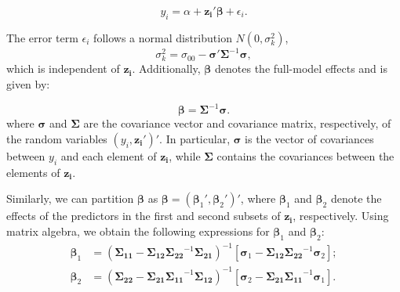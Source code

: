 $$
y_i = \alpha + \boldsymbol{z_i}'\boldsymbol{\beta} + \epsilon_i.
$$

The error term $\epsilon_i$ follows a normal distribution $N(0, \sigma_k^2)$, \begin{equation}\label{eq:sigmak2}
\sigma_k^2 = \sigma_{00} - \boldsymbol{\sigma}' \boldsymbol{\Sigma}^{-1} \boldsymbol{\sigma},
\end{equation} which is independent of $\boldsymbol{z_i}$.
Additionally, $\boldsymbol{\beta}$ denotes the full-model effects and is given by:

\begin{equation}
\label{eq:full.reg.coeff}
\boldsymbol{\beta} = \boldsymbol{\Sigma}^{-1}\boldsymbol{\sigma}. 
\end{equation}
where $\boldsymbol{\sigma}$ and $\boldsymbol{\Sigma}$ are the covariance vector and covariance matrix, respectively, of the random variables $(y_i, \boldsymbol{z_i}')'$. In particular, $\boldsymbol{\sigma}$ is the vector of covariances between $y_i$ and each element of $\boldsymbol{z_i}$, while $\boldsymbol{\Sigma}$ contains the covariances between the elements of $\boldsymbol{z_i}$.

Similarly, we can partition $\boldsymbol{\beta}$ as $\boldsymbol{\beta} = (\boldsymbol{\beta}_1', \boldsymbol{\beta}_2')'$, where $\boldsymbol{\beta}_1$ and $\boldsymbol{\beta}_2$ denote the effects of the predictors in the first and second subsets of $\boldsymbol{z_i}$, respectively. Using matrix algebra, we obtain the following expressions for $\boldsymbol{\beta}_1$ and $\boldsymbol{\beta}_2$:
\begin{equation}
\begin{aligned}
\boldsymbol{\beta}_1 &= ( \boldsymbol{\Sigma_{11}} -  \boldsymbol{\Sigma_{12}} \boldsymbol{\Sigma_{22}}^{-1}  \boldsymbol{\Sigma_{21}})^{-1}[\boldsymbol{\sigma}_1 -  \boldsymbol{\Sigma_{12}} \boldsymbol{\Sigma_{22}}^{-1}\boldsymbol{\sigma}_2]; \\
\boldsymbol{\beta}_2 &= ( \boldsymbol{\Sigma_{22}} -  \boldsymbol{\Sigma_{21}} \boldsymbol{\Sigma_{11}}^{-1}  \boldsymbol{\Sigma_{12}})^{-1}[\boldsymbol{\sigma}_2 -  \boldsymbol{\Sigma_{21}} \boldsymbol{\Sigma_{11}}^{-1}\boldsymbol{\sigma}_1].
\end{aligned}
\end{equation}

